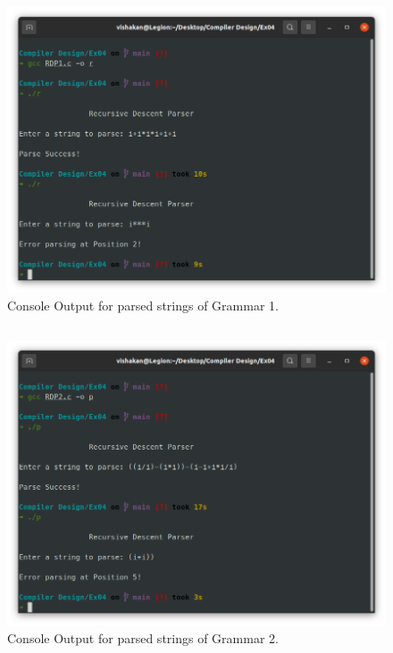 \documentclass[12pt, a4]{article}
\begin{document}
\newpage
\subsection*{}
\begin{figure}[h]
\centering
\caption{Console Output for parsed strings of Grammar 1.}
\includegraphics[scale= 0.5]{RDP1OP.png}
\end{figure}

\newpage
\subsection*{}
\begin{flushleft}

\end{flushleft}

\newpage
\subsection*{}
\begin{figure}[h]
\centering
\caption{Console Output for parsed strings of Grammar 2.}
\includegraphics[scale= 0.5]{RDP2OP.png}
\end{figure}
\end{document}

